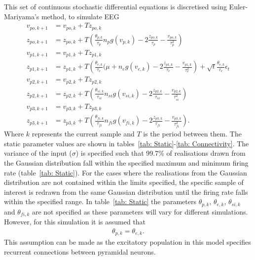 This set of continuous stochastic differential equations is discretised using Euler-Mariyama's method, to simulate EEG \begin{align}
\label{eqn: EulerW1}
v_{po,k+1}&=v_{po,k}+Tz_{po,k}\\
z_{po,k+1}&=z_{po,k}+T\left(\frac{\theta_{p,k}}{\tau_{p}}n_{p}g(v_{p,k})-2\frac{z_{po,k}}{\tau_{p}}-\frac{v_{po,k}}{\tau_{p}^{2}}\right)\\
v_{p1,k+1}&=v_{p1,k}+Tz_{p1,k}\\
z_{p1,k+1}&=z_{p1,k}+T\left(\frac{\theta_{e,k}}{\tau_{e}}(\mu +n_{e}g(v_{e,k})-2\frac{z_{p1,k}}{\tau_{e}}-\frac{v_{p1,k}}{\tau_{e}^{2}}\right) + \sqrt{t}\frac{\theta_{e,k}}{\tau_{e}}\epsilon_{t}\\
v_{p2,k+1}&=v_{p2,k}+Tz_{p2,k}\\
z_{p2,k+1}&=z_{p2,k}+T\left(\frac{\theta_{si,k}}{\tau_{si}}n_{si}g(v_{si,k})-2\frac{z_{p2,k}}{\tau_{si}}-\frac{v_{p2,k}}{\tau_{si}^{2}}\right)\\
v_{p3,k+1}&=v_{p3,k}+Tz_{p3,k}\\
\label{eqn: EulerW8}
z_{p3,k+1}&=z_{p3,k}+T\left(\frac{\theta_{fi,k}}{\tau_{fi}}n_{fi}g(v_{fi,k})-2\frac{z_{p3,k}}{\tau_{fi}}-\frac{v_{p3,k}}{\tau_{fi}^{2}}\right).
\end{align} Where $k$ represents the current sample and $T$ is the period between them. The static parameter values are shown in  tables~\ref{tab: Static}-\ref{tab: Connectivity}. The variance of the input ($\sigma$) is specified such that 99.7\% of realisations drawn from the Gaussian distribution fall within the specified maximum and minimum firing rate (table~\ref{tab: Static}). For the cases where the realisations from the Gaussian distribution are not contained within the limits specified, the specific sample of interest is redrawn from the same Gaussian distribution until the firing rate falls within the specified range. In table~\ref{tab: Static} the parameters $\theta_{p,k}$, $\theta_{e,k}$, $\theta_{si,k}$ and $\theta_{fi,k}$ are not specified as these parameters will vary for different simulations. However, for this simulation it is assumed that \begin{align}
\theta_{p,k} = \theta_{e,k}.
\end{align} This assumption can be made as the excitatory population in this model specifies recurrent connections between pyramidal neurons.  
\singlespacing
\small
